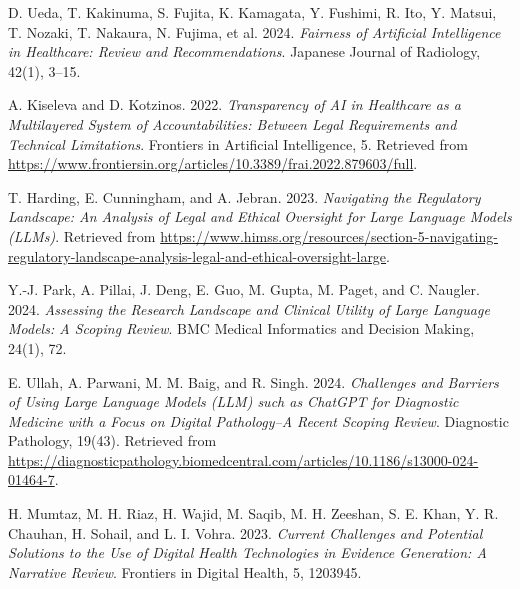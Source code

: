\begin{thebibliography}{55}
D. Ueda, T. Kakinuma, S. Fujita, K. Kamagata, Y. Fushimi, R. Ito, Y. Matsui, T. Nozaki, T. Nakaura, N. Fujima, et al. 2024. \emph{Fairness of Artificial Intelligence in Healthcare: Review and Recommendations}. Japanese Journal of Radiology, 42(1), 3--15.

A. Kiseleva and D. Kotzinos. 2022. \emph{Transparency of AI in Healthcare as a Multilayered System of Accountabilities: Between Legal Requirements and Technical Limitations}. Frontiers in Artificial Intelligence, 5. Retrieved from \url{https://www.frontiersin.org/articles/10.3389/frai.2022.879603/full}.

T. Harding, E. Cunningham, and A. Jebran. 2023. \emph{Navigating the Regulatory Landscape: An Analysis of Legal and Ethical Oversight for Large Language Models (LLMs)}. Retrieved from \url{https://www.himss.org/resources/section-5-navigating-regulatory-landscape-analysis-legal-and-ethical-oversight-large}.

Y.-J. Park, A. Pillai, J. Deng, E. Guo, M. Gupta, M. Paget, and C. Naugler. 2024. \emph{Assessing the Research Landscape and Clinical Utility of Large Language Models: A Scoping Review}. BMC Medical Informatics and Decision Making, 24(1), 72.

E. Ullah, A. Parwani, M. M. Baig, and R. Singh. 2024. \emph{Challenges and Barriers of Using Large Language Models (LLM) such as ChatGPT for Diagnostic Medicine with a Focus on Digital Pathology--A Recent Scoping Review}. Diagnostic Pathology, 19(43). Retrieved from \url{https://diagnosticpathology.biomedcentral.com/articles/10.1186/s13000-024-01464-7}.

H. Mumtaz, M. H. Riaz, H. Wajid, M. Saqib, M. H. Zeeshan, S. E. Khan, Y. R. Chauhan, H. Sohail, and L. I. Vohra. 2023. \emph{Current Challenges and Potential Solutions to the Use of Digital Health Technologies in Evidence Generation: A Narrative Review}. Frontiers in Digital Health, 5, 1203945.

\end{thebibliography}


